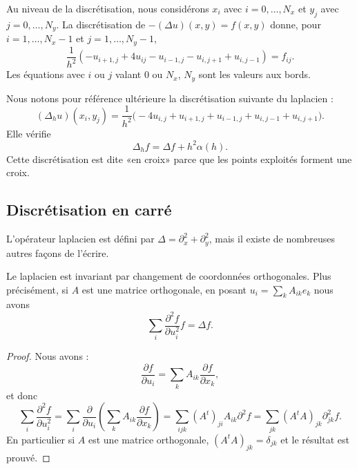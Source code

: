 Au niveau de la discrétisation, nous considérons \( x_i\) avec \( i=0,\ldots, N_x\) et \( y_j\) avec \( j=0,\ldots, N_y\). La discrétisation de \( -(\Delta u)(x,y)=f(x,y)\) donne, pour \( i=1,\ldots, N_x-1\) et \( j=1,\ldots, N_y-1\),
\begin{equation}        \label{EQooPWXBooPimUrU}
	\frac{1}{ h^2 }(-u_{i+1,j}+4u_{ij}-u_{i-1,j}-u_{i,j+1}+u_{i,j-1})=f_{ij}.
\end{equation}
Les équations avec \( i\) ou \( j\) valant \( 0\) ou \( N_x\), \( N_y\) sont les valeurs aux bords.

\begin{normaltext}
	Nous notons pour référence ultérieure la discrétisation suivante du laplacien :
	\begin{equation}    \label{EQooQQUHooNYVqta}
		(\Delta_hu)(x_i,y_j)=\frac{1}{ h^2 }\big( -4u_{i,j}+u_{i+1,j}+u_{i-1,j}+u_{i,j-1}+u_{i,j+1} \big).
	\end{equation}
	Elle vérifie
	\begin{equation}
		\Delta_hf=\Delta f+h^2\alpha(h).
	\end{equation}
	Cette discrétisation est dite «en croix» parce que les points exploités forment une croix.
\end{normaltext}

\subsection{Discrétisation en carré}

L'opérateur laplacien est défini par \( \Delta=\partial_x^2+\partial_y^2\), mais il existe de nombreuses autres façons de l'écrire.

\begin{lemma}
	Le laplacien est invariant par changement de coordonnées orthogonales. Plus précisément, si \( A\) est une matrice orthogonale, en posant \( u_i=\sum_kA_{ik}e_k\) nous avons
	\begin{equation}
		\sum_i\frac{ \partial^2f }{ \partial u_i^2 }f=\Delta f.
	\end{equation}
\end{lemma}

\begin{proof}
	Nous avons :
	\begin{equation}
		\frac{ \partial f }{ \partial u_i }=\sum_kA_{ik}\frac{ \partial f }{ \partial x_k },
	\end{equation}
	et donc
	\begin{equation}
		\sum_i\frac{ \partial^2f }{ \partial u_i^2 }=\sum_i\frac{ \partial  }{ \partial u_i }\left( \sum_kA_{ik}\frac{ \partial f }{ \partial x_k } \right)=\sum_{ijk}(A^t)_{ji}A_{ik}\partial^2f=\sum_{jk}(A^tA)_{jk}\partial^2_{jk}f.
	\end{equation}
	En particulier si \( A\) est une matrice orthogonale, \( (A^tA)_{jk}=\delta_{jk}\) et le résultat est prouvé.
\end{proof}

